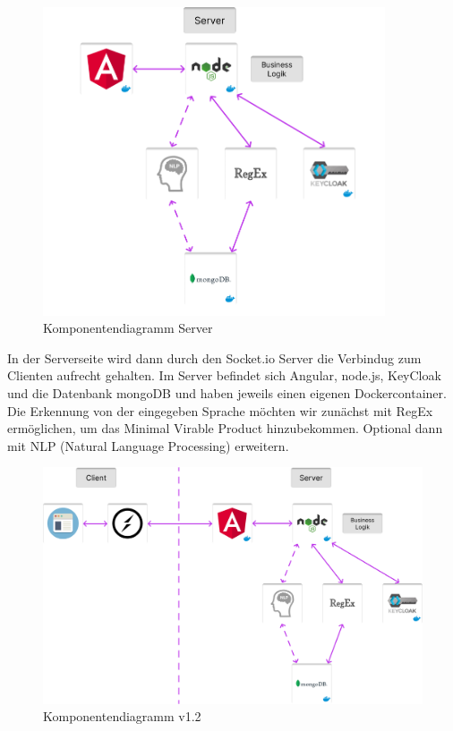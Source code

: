 \begin{figure}[!hbt]
\centering
\includegraphics[width=0.9\textwidth]{bilder/technologien/KomponentendiagramServer.png}
\caption{Komponentendiagramm Server}
\label{fig:Komponentendiagramm_Server}
\end{figure}
In der Serverseite wird dann durch den Socket.io Server die Verbindug zum Clienten aufrecht gehalten.
Im Server befindet sich Angular, node.js, KeyCloak und die Datenbank mongoDB und haben jeweils einen eigenen Dockercontainer. 
Die Erkennung von der eingegeben Sprache möchten wir zunächst mit RegEx ermöglichen, 
um das Minimal Virable Product hinzubekommen. Optional dann mit NLP (Natural Language Processing) erweitern.

\begin{figure}[!hbt]
\centering
\includegraphics[width=1.0\textwidth]{bilder/technologien/Komponentendiagram v1.2.png}
\caption{Komponentendiagramm v1.2}
\label{fig:Komponentendiagramm_v1.2}
\end{figure}

